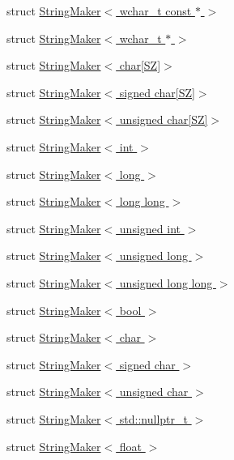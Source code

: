 \begin{DoxyCompactItemize}
\item 
struct \hyperlink{struct_catch_1_1_string_maker_3_01wchar__t_01const_01_5_01_4}{String\-Maker$<$ wchar\-\_\-t const $\ast$ $>$}
\item 
struct \hyperlink{struct_catch_1_1_string_maker_3_01wchar__t_01_5_01_4}{String\-Maker$<$ wchar\-\_\-t $\ast$ $>$}
\item 
struct \hyperlink{struct_catch_1_1_string_maker_3_01char[_s_z]_4}{String\-Maker$<$ char\mbox{[}\-S\-Z\mbox{]}$>$}
\item 
struct \hyperlink{struct_catch_1_1_string_maker_3_01signed_01char[_s_z]_4}{String\-Maker$<$ signed char\mbox{[}\-S\-Z\mbox{]}$>$}
\item 
struct \hyperlink{struct_catch_1_1_string_maker_3_01unsigned_01char[_s_z]_4}{String\-Maker$<$ unsigned char\mbox{[}\-S\-Z\mbox{]}$>$}
\item 
struct \hyperlink{struct_catch_1_1_string_maker_3_01int_01_4}{String\-Maker$<$ int $>$}
\item 
struct \hyperlink{struct_catch_1_1_string_maker_3_01long_01_4}{String\-Maker$<$ long $>$}
\item 
struct \hyperlink{struct_catch_1_1_string_maker_3_01long_01long_01_4}{String\-Maker$<$ long long $>$}
\item 
struct \hyperlink{struct_catch_1_1_string_maker_3_01unsigned_01int_01_4}{String\-Maker$<$ unsigned int $>$}
\item 
struct \hyperlink{struct_catch_1_1_string_maker_3_01unsigned_01long_01_4}{String\-Maker$<$ unsigned long $>$}
\item 
struct \hyperlink{struct_catch_1_1_string_maker_3_01unsigned_01long_01long_01_4}{String\-Maker$<$ unsigned long long $>$}
\item 
struct \hyperlink{struct_catch_1_1_string_maker_3_01bool_01_4}{String\-Maker$<$ bool $>$}
\item 
struct \hyperlink{struct_catch_1_1_string_maker_3_01char_01_4}{String\-Maker$<$ char $>$}
\item 
struct \hyperlink{struct_catch_1_1_string_maker_3_01signed_01char_01_4}{String\-Maker$<$ signed char $>$}
\item 
struct \hyperlink{struct_catch_1_1_string_maker_3_01unsigned_01char_01_4}{String\-Maker$<$ unsigned char $>$}
\item 
struct \hyperlink{struct_catch_1_1_string_maker_3_01std_1_1nullptr__t_01_4}{String\-Maker$<$ std\-::nullptr\-\_\-t $>$}
\item 
struct \hyperlink{struct_catch_1_1_string_maker_3_01float_01_4}{String\-Maker$<$ float $>$}

\end{DoxyCompactItemize}
